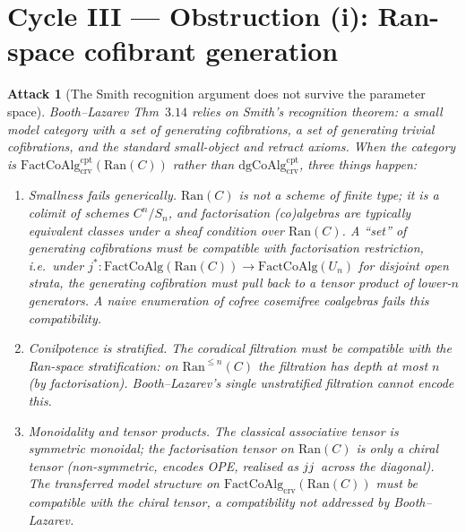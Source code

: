 \documentclass[11pt]{amsart}
\newtheorem{attack}{Attack}
\newcommand{\Ran}{\mathrm{Ran}}
\newcommand{\FactCoAlg}{\mathrm{FactCoAlg}}
\newcommand{\crv}{\mathrm{crv}}
\newcommand{\cpt}{\mathrm{cpt}}
\newcommand{\dgCoAlg}{\mathrm{dgCoAlg}}
\begin{document}
\section{Cycle III --- Obstruction (i): Ran-space cofibrant generation}
\label{sec:cycle-III}

\begin{attack}[The Smith recognition argument does not survive the
parameter space]
Booth--Lazarev Thm~$3.14$ relies on Smith's recognition theorem:
a small model category with a set of generating cofibrations, a set of
generating trivial cofibrations, and the standard small-object and
retract axioms. When the category is
$\FactCoAlg^{\cpt}_{\crv}(\Ran(C))$ rather than $\dgCoAlg^{\cpt}_{\crv}$,
three things happen:
\begin{enumerate}[label=(\roman*)]
\item \emph{Smallness fails generically.} $\Ran(C)$ is not a scheme
of finite type; it is a colimit of schemes $C^n/S_n$, and factorisation
(co)algebras are typically equivalent classes under a sheaf condition
over $\Ran(C)$. A ``set'' of generating cofibrations must be
\emph{compatible with factorisation restriction}, i.e.\ under
$j^*:\FactCoAlg(\Ran(C))\to\FactCoAlg(U_n)$ for disjoint open strata,
the generating cofibration must pull back to a tensor product of
lower-$n$ generators. A naive enumeration of cofree cosemifree
coalgebras fails this compatibility.
\item \emph{Conilpotence is stratified.} The coradical filtration
must be compatible with the Ran-space stratification: on
$\Ran^{\leq n}(C)$ the filtration has depth at most $n$ (by
factorisation). Booth--Lazarev's single unstratified filtration
cannot encode this.
\item \emph{Monoidality and tensor products.} The classical
associative tensor is symmetric monoidal; the factorisation tensor
on $\Ran(C)$ is only a \emph{chiral} tensor (non-symmetric, encodes
OPE, realised as $j_{\*}j^{\*}$ across the diagonal). The
transferred model structure on $\FactCoAlg_{\crv}(\Ran(C))$ must be
compatible with the chiral tensor, a compatibility not addressed
by Booth--Lazarev.
\end{enumerate}
\end{attack}
\end{document}
